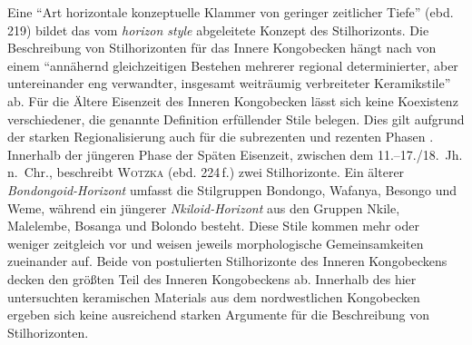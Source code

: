 Eine \enquote{Art horizontale konzeptuelle Klammer von geringer zeitlicher Tiefe} (ebd. 219) bildet das vom \textit{horizon style} \parencite[108--111]{Kroeber.1944} abgeleitete Konzept des Stilhorizonts. Die Beschreibung von Stilhorizonten für das Innere Kongobecken hängt nach \textcite[224]{Wotzka.1995} von einem \enquote{annähernd gleichzeitigen Bestehen mehrerer regional determinierter, aber untereinander eng verwandter, insgesamt weiträumig verbreiteter Keramikstile} ab. Für die Ältere Eisenzeit des Inneren Kongobecken lässt sich keine Koexistenz verschiedener, die genannte Definition erfüllender Stile belegen. Dies gilt aufgrund der starken Regionalisierung auch für die subrezenten und rezenten Phasen \parencite{Wotzka.1995}. Innerhalb der jüngeren Phase der Späten Eisenzeit, zwischen dem \mbox{11.--17./18.~Jh.} n.~Chr., beschreibt \textsc{Wotzka} (ebd. 224\,f.) zwei Stilhorizonte. Ein älterer \textit{Bondongoid-Horizont} umfasst die Stilgruppen Bondongo, Wafanya, Besongo und Weme, während ein jüngerer \textit{Nkiloid-Horizont} aus den Gruppen Nkile, Malelembe, Bosanga und Bolondo besteht. Diese Stile kommen mehr oder weniger zeitgleich vor und weisen jeweils morphologische Gemeinsamkeiten zueinander auf. Beide von \textcite{Wotzka.1995} postulierten Stilhorizonte des Inneren Kongobeckens decken den größten Teil des Inneren Kongobeckens ab. Innerhalb des hier untersuchten keramischen Materials aus dem nordwestlichen Kongobecken ergeben sich keine ausreichend starken Argumente für die Beschreibung von Stilhorizonten.